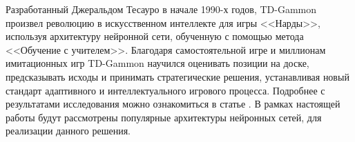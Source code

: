 Разработанный Джеральдом Тесауро в начале 1990-х годов, TD-Gammon произвел революцию в искусственном интеллекте для игры <<Нарды>>, используя архитектуру нейронной сети, обученную с помощью метода <<Обучение с учителем>>. Благодаря самостоятельной игре и миллионам имитационных игр TD-Gammon научился оценивать позиции на доске, предсказывать исходы и принимать стратегические решения, устанавливая новый стандарт адаптивного и интеллектуального игрового процесса. Подробнее с результатами исследования можно ознакомиться в статье \cite{tdl-gammon}. В рамках настоящей работы будут рассмотрены популярные архитектуры нейронных сетей, для реализации данного решения.
